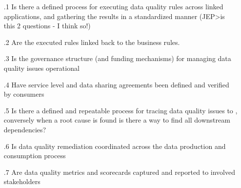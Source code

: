 \begin{itemize}[leftmargin=.5in]

  \item [\thesection.1] Is there a defined process for executing data quality rules across linked applications, and gathering the results in a standardized manner (JEP>is this 2 questions - I think so!)
  \item [\thesection.2] Are the executed rules linked back to the business rules.
  \item [\thesection.3] Is the governance structure (and funding mechanisms) for managing data quality issues operational
  \item [\thesection.4] Have service level and data sharing agreements been defined and verified by consumers
  \item [\thesection.5] Is there a defined and repeatable process for tracing data quality issues to , conversely when a root cause is found is there a way to find all downstream dependencies?
  \item [\thesection.6] Is data quality remediation coordinated across the data production and consumption process
  \item [\thesection.7] Are data quality metrics and scorecards captured and reported to involved stakeholders

\end{itemize}
